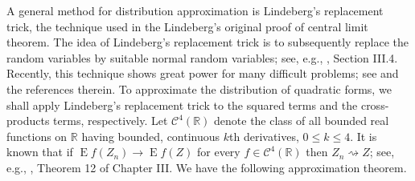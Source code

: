 \documentclass[smallextended]{svjour3}       %
\DeclareMathOperator{\myE}{E}
\begin{document}
A general method for distribution approximation is Lindeberg's replacement trick, the technique used in the Lindeberg's original proof of central limit theorem.
The idea of Lindeberg's replacement trick is to subsequently replace the random variables by suitable normal random variables; see, e.g., \cite{pollard1984convergence}, Section III.4.
Recently, this technique shows great power for many difficult problems; see \cite{Chatterjee2006} and the references therein.
To approximate the distribution of quadratic forms, we shall apply Lindeberg's replacement trick to the squared terms and the cross-products terms, respectively.
Let $\mathscr C^4(\mathbb R)$ denote the class of all bounded real functions on $\mathbb R$ having bounded, continuous $k$th derivatives, $0\leq k\leq 4$.
It is known that if $\myE f(Z_n)\to \myE f(Z)$ for every $f\in \mathscr C^4 (\mathbb R)$ then $Z_n \rightsquigarrow Z$; see, e.g., \cite{pollard1984convergence}, Theorem 12 of Chapter III.
We have the following approximation theorem.
\end{document}
